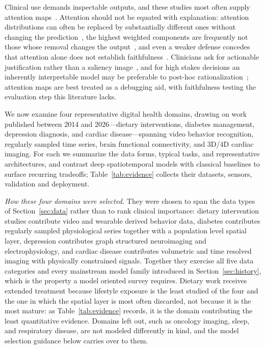 \documentclass[journal]{IEEEtran}
\begin{document}
Clinical use demands inspectable outputs, and these studies most often supply attention maps~\cite{2,4}. Attention should not be equated with explanation: attention distributions can often be replaced by substantially different ones without changing the prediction~\cite{jain2019attention}, the highest weighted components are frequently not those whose removal changes the output~\cite{serrano2019attention}, and even a weaker defense concedes that attention alone does not establish faithfulness~\cite{wiegreffe2019attention}. Clinicians ask for actionable justification rather than a saliency image~\cite{tonekaboni2019clinicians}, and for high stakes decisions an inherently interpretable model may be preferable to post-hoc rationalization~\cite{rudin2019stopexplaining}; attention maps are best treated as a debugging aid, with faithfulness testing the evaluation step this literature lacks.

\else
We now examine four representative digital health domains, drawing on work published between 2014 and 2026---dietary interventions, diabetes management, depression diagnosis, and cardiac disease---spanning video behavior recognition, regularly sampled time series, brain functional connectivity, and 3D/4D cardiac imaging. For each we summarize the data forms, typical tasks, and representative architectures, and contrast deep spatiotemporal models with classical baselines to surface recurring tradeoffs; Table~\ref{tab:evidence} collects their datasets, sensors, validation and deployment.

\emph{How these four domains were selected.} They were chosen to span the data types of Section~\ref{sec:data} rather than to rank clinical importance: dietary intervention studies contribute video and wearable derived behavior data, diabetes contributes regularly sampled physiological series together with a population level spatial layer, depression contributes graph structured neuroimaging and electrophysiology, and cardiac disease contributes volumetric and time resolved imaging with physically constrained signals. Together they exercise all five data categories and every mainstream model family introduced in Section~\ref{sec:history}, which is the property a model oriented survey requires. Dietary work receives extended treatment because lifestyle exposure is the least studied of the four and the one in which the spatial layer is most often discarded, not because it is the most mature: as Table~\ref{tab:evidence} records, it is the domain contributing the least quantitative evidence. Domains left out, such as oncology imaging, sleep, and respiratory disease, are not modeled differently in kind, and the model selection guidance below carries over to them.
\end{document}
